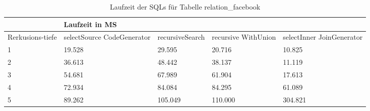 \begin{table}[H]
	\begin{tabular}{l|l|l|l|l|l|}
		\cline{2-6}
		& \multicolumn{5}{|l|}{Laufzeit in MS}                                                                                                                                                  \\ \hline
		\multicolumn{1}{|l|}{\multirow{2}{2cm}{Rerkusions-tiefe}} & \multicolumn{2}{|l|}{\multirow{2}{3cm}{selectSource CodeGenerator}} & \multirow{2}{2.8cm}{recursiveSearch} & \multirow{2}{2.5cm}{recursive WithUnion} & \multirow{2}{2.5cm}{selectInner JoinGenerator} \\
		\multicolumn{1}{|l|}{}
		& \multicolumn{2}{|l|}{}                                           &                                  &                                     &                                           \\ \hline
		\multicolumn{1}{|l|}{1}                                 & \multicolumn{2}{l|}{19.528}                                      & 29.595                                                & 20.716                                                    & 10.825                                                          \\ \hline
		\multicolumn{1}{|l|}{2}                                 & \multicolumn{2}{l|}{36.613}                                      & 48.442                                                & 38.137                                                    & 11.119                                                          \\ \hline
		\multicolumn{1}{|l|}{3}                                 & \multicolumn{2}{l|}{54.681}                                      & 67.989                                                & 61.904                                                    & 17.613                                                          \\ \hline
		\multicolumn{1}{|l|}{4}                                 & \multicolumn{2}{l|}{72.934}                                      & 84.084                                                & 84.295                                                    & 61.089                                                          \\ \hline
		\multicolumn{1}{|l|}{5}                                 & \multicolumn{2}{l|}{89.262}                                      & 105.049                                               & 110.000                                                   & 304.821                                                         \\ \hline
		
		
	\end{tabular}
	\caption{Laufzeit der SQLs für Tabelle relation\_facebook}
\end{table}


